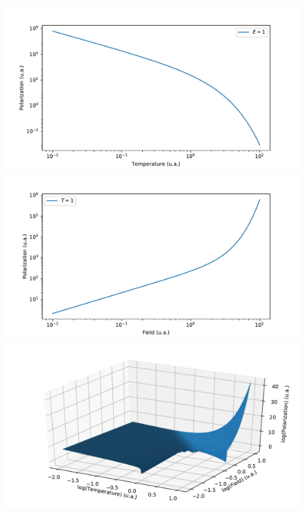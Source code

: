 \documentclass[11pt]{article}
\begin{document}
	\begin{figure}[h]
		\centering
		\includegraphics[height=0.3\textheight]{Temperature.pdf}
		\includegraphics[height=0.3\textheight]{Field.pdf}
		\includegraphics[height=0.3\textheight]{Both.pdf}
	\end{figure}
\end{document}
